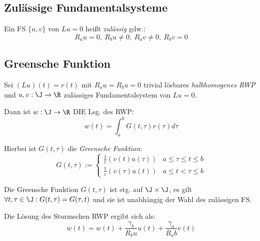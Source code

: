 \subsection*{Zulässige Fundamentalsysteme}

Ein FS \(\{u,v\}\) von \(Lu=0\) heißt \emph{zulässig} gdw.: \[R_a u = 0, \ R_b u \neq 0, \ R_a v \neq 0, \ R_b v = 0\]

\subsection*{Greensche Funktion}

Sei \((Lu)(t)=r(t)\) mit \(R_a u = R_b u = 0\) trivial lösbares \emph{halbhomogenes RWP} und \(u, v : \J \to \R\) zulässiges Fundamentalsystem von \(Lu=0\).

Dann ist \(w : \J \to \R\) DIE Lsg. des RWP: \[w(t)=\int_a^b G(t,\tau)r(\tau) d\tau\]

Hierbei ist \(G(t,\tau)\) die \emph{Greensche Funktion}:
\[G(t,\tau) := \begin{cases}
	\frac{1}{c}(v(t)u(\tau)) & a \leq \tau \leq t \leq b \\
	\frac{1}{c}(v(\tau)u(t)) & a \leq t < \tau \leq b
\end{cases}\]

Die Greensche Funktion \(G(t,\tau)\) ist stg. auf \(\J \times \J\), es gilt \(\forall t, \tau \in \J : G(t,\tau)=G(\tau,t)\) und sie ist unabhängig der Wahl des zulässigen FS.

Die Lösung des Sturmschen RWP ergibt sich als: \[\overline w(t) = w(t) + \frac{\gamma_b}{R_b u} u(t) + \frac{\gamma_a}{R_a b} v(t)\]
